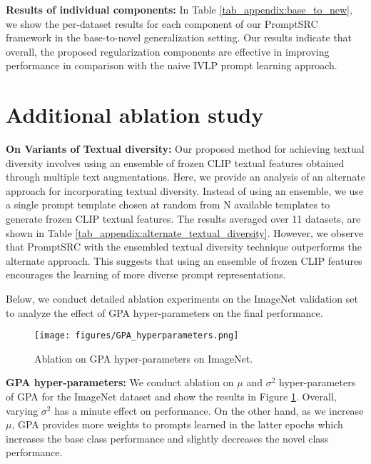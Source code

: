 \documentclass[10pt,twocolumn,letterpaper]{article}
\begin{document}
\noindent \textbf{{Results of individual components:}} In Table \ref{tab_appendix:base_to_new}, we show the per-dataset results for each component of our PromptSRC framework in the base-to-novel generalization setting. Our results indicate that overall, the proposed regularization components are effective in improving performance in comparison with the naive IVLP prompt learning approach.

\section{Additional ablation study}
\label{appendix:additional_ablation}
\noindent \textbf{On Variants of Textual diversity:} Our proposed method for achieving textual diversity involves using an ensemble of frozen CLIP textual features obtained through multiple text augmentations. Here, we provide an analysis of an alternate approach for incorporating textual diversity. Instead of using an ensemble, we use a single prompt template chosen at random from N available templates to generate frozen CLIP textual features. The results averaged over 11 datasets, are shown in Table \ref{tab_appendix:alternate_textual_diversity}. However, we observe that PromptSRC with the ensembled textual diversity technique outperforms the alternate approach. This suggests that using an ensemble of frozen CLIP features encourages the learning of more diverse prompt representations.

Below, we conduct detailed ablation experiments on the ImageNet validation set to analyze the effect of GPA hyper-parameters on the final performance.

\begin{figure}[!t]
    \centering
    \texttt{[image: figures/GPA\_hyperparameters.png]}
\caption{Ablation on GPA hyper-parameters on ImageNet.}
  \label{fig:gpa_hyperparameters}
\end{figure}

\noindent \textbf{GPA hyper-parameters:}
We conduct ablation on $\mu$ and $\sigma^{2}$ hyper-parameters of GPA for the ImageNet dataset and show the results in Figure \ref{fig:gpa_hyperparameters}. Overall, varying $\sigma^{2}$ has a minute effect on performance. On the other hand, as we increase $\mu$, GPA provides more weights to prompts learned in the latter epochs which increases the base class performance and slightly decreases the novel class performance.
\end{document}
